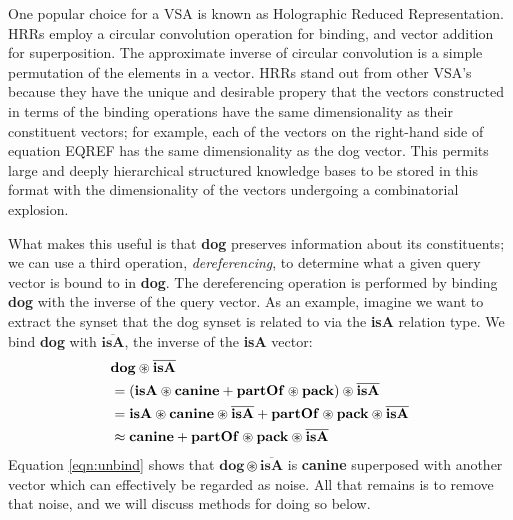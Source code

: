 \documentclass[10pt,letterpaper]{article}
\begin{document}
One popular choice for a VSA is known as Holographic Reduced Representation. HRRs employ a circular convolution operation for binding, and vector addition for superposition. The approximate inverse of circular convolution is a simple permutation of the elements in a vector. HRRs stand out from other VSA's because they have the unique and desirable propery that the vectors constructed in terms of the binding operations have the same dimensionality as their constituent vectors; for example, each of the vectors on the right-hand side of equation EQREF has the same dimensionality as the dog vector. This permits large and deeply hierarchical structured knowledge bases to be stored in this format with the dimensionality of the vectors undergoing a combinatorial explosion.

What makes this useful is that \textbf{dog} preserves information about its constituents; we can use a third operation, \textit{dereferencing}, to determine what a given query vector is bound to in \textbf{dog}. The dereferencing operation is performed by binding \textbf{dog} with the inverse of the query vector. As an example, imagine we want to extract the synset that the dog synset is related to via the \textbf{isA} relation type. We bind \textbf{dog} with $\overline{\mathbf{isA}}$, the inverse of the \textbf{isA} vector:
\begin{align}
&\mathbf{dog} \circledast \overline{\mathbf{isA} }\notag\\
&=(\mathbf{isA} \circledast \mathbf{canine} + \mathbf{partOf} \circledast \mathbf{pack}) \circledast \overline{\mathbf{isA} }\notag\\
&=\mathbf{isA} \circledast \mathbf{canine} \circledast \overline{\mathbf{isA} } + \mathbf{partOf} \circledast \mathbf{pack} \circledast \overline{\mathbf{isA} }\notag\\
&\approx \mathbf{canine} + \mathbf{partOf} \circledast \mathbf{pack} \circledast \overline{\mathbf{isA} }\label{eqn:unbind}
\end{align}
Equation \eqref{eqn:unbind} shows that $\mathbf{dog \circledast \overline{isA}}$ is \textbf{canine} superposed with another vector which can effectively be regarded as noise. All that remains is to remove that noise, and we will discuss methods for doing so below.
 
\end{document}
